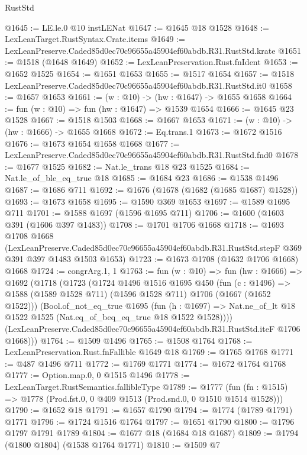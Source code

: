 \begin{lexlean}{RustStd}
\begin{coremodule}
@1645 := LE.le.{0} @10 instLENat
@1647 := @1645 @18 @1528
@1648 := LexLeanTarget.RustSyntax.Crate.items
@1649 := LexLeanPreserve.Caded85d0ec70c96655a45904ef60abdb.R31.RustStd.krate
@1651 := @1518 (@1648 @1649)
@1652 := LexLeanPreservation.Rust.fnIdent
@1653 := @1652 @1525
@1654 := @1651 @1653
@1655 := @1517 @1654
@1657 := @1518 LexLeanPreserve.Caded85d0ec70c96655a45904ef60abdb.R31.RustStd.it0
@1658 := @1657 @1653
@1661 := (w : @10) -> (hw : @1647) -> @1655 @1658
@1664 := fun (w : @10) => fun (hw : @1647) => @1539 @1654
@1666 := @1645 @23 @1528
@1667 := @1518 @1503
@1668 := @1667 @1653
@1671 := (w : @10) -> (hw : @1666) -> @1655 @1668
@1672 := Eq.trans.{1}
@1673 := @1672 @1516
@1676 := @1673 @1654 @1658 @1668
@1677 := LexLeanPreserve.Caded85d0ec70c96655a45904ef60abdb.R31.RustStd.fnd0
@1678 := @1677 @1525
@1682 := Nat.le_trans @18 @23 @1525
@1684 := Nat.le_of_ble_eq_true @18
@1685 := @1684 @23
@1686 := @1538 @1496
@1687 := @1686 @711
@1692 := @1676 (@1678 (@1682 (@1685 @1687) @1528))
@1693 := @1673 @1658
@1695 := @1590 @369 @1653
@1697 := @1589 @1695 @711
@1701 := @1588 @1697 (@1596 @1695 @711)
@1706 := @1600 (@1603 @391 (@1606 @397 @1483))
@1708 := @1701 @1706 @1668
@1718 := @1693
    @1708
    @1668
    (LexLeanPreserve.Caded85d0ec70c96655a45904ef60abdb.R31.RustStd.stepF
      @369
      @391
      @397
      @1483
      @1503
      @1653)
@1723 := @1673 @1708 (@1632 @1706 @1668) @1668
@1724 := congrArg.{1, 1}
@1763 := fun (w : @10) =>
  fun (hw : @1666) =>
  @1692
    (@1718
      (@1723
        (@1724
          @1496
          @1516
          @1695
          @450
          (fun (c : @1496) =>
          @1588 (@1589 @1528 @711) (@1596 @1528 @711) @1706 (@1667 (@1652 @1522)))
          (Bool.of_not_eq_true
            @1695
            (fun (h : @1697) =>
            Nat.ne_of_lt @18 @1522 @1525 (Nat.eq_of_beq_eq_true @18 @1522 @1528))))
        (LexLeanPreserve.Caded85d0ec70c96655a45904ef60abdb.R31.RustStd.iteF @1706 @1668)))
@1764 := @1509 @1496
@1765 := @1508 @1764
@1768 := LexLeanPreservation.Rust.fnFallible @1649 @18
@1769 := @1765 @1768
@1771 := @487 @1496 @711
@1772 := @1769 @1771
@1774 := @1672 @1764 @1768
@1777 := Option.map.{0, 0} @1515 @1496
@1778 := LexLeanTarget.RustSemantics.fallibleType
@1789 := @1777
    (fun (fn : @1515) => @1778 (Prod.fst.{0, 0} @409 @1513 (Prod.snd.{0, 0} @1510 @1514 @1528)))
@1790 := @1652 @18
@1791 := @1657 @1790
@1794 := @1774 (@1789 @1791) @1771
@1796 := @1724 @1516 @1764
@1797 := @1651 @1790
@1800 := @1796 @1797 @1791 @1789
@1804 := @1677 @18 (@1684 @18 @1687)
@1809 := @1794 (@1800 @1804) (@1538 @1764 @1771)
@1810 := @1509 @7

\end{coremodule}
\end{lexlean}
